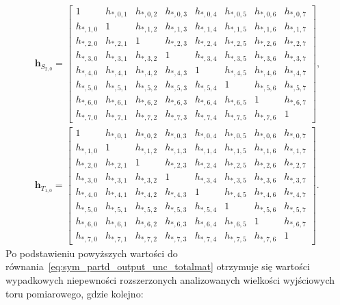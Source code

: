 \begin{gather}
\mathbf{h}_{S_{2,0}} =
\begin{bmatrix}
1 & h_{*,0,1} & h_{*,0,2} & h_{*,0,3} & h_{*,0,4} & h_{*,0,5} & h_{*,0,6} & h_{*,0,7} \\
h_{*,1,0} & 1 & h_{*,1,2} & h_{*,1,3} & h_{*,1,4} & h_{*,1,5} & h_{*,1,6} & h_{*,1,7} \\
h_{*,2,0} & h_{*,2,1} & 1 & h_{*,2,3} & h_{*,2,4} & h_{*,2,5} & h_{*,2,6} & h_{*,2,7} \\
h_{*,3,0} & h_{*,3,1} & h_{*,3,2} & 1 & h_{*,3,4} & h_{*,3,5} & h_{*,3,6} & h_{*,3,7} \\
h_{*,4,0} & h_{*,4,1} & h_{*,4,2} & h_{*,4,3} & 1 & h_{*,4,5} & h_{*,4,6} & h_{*,4,7} \\
h_{*,5,0} & h_{*,5,1} & h_{*,5,2} & h_{*,5,3} & h_{*,5,4} & 1 & h_{*,5,6} & h_{*,5,7} \\
h_{*,6,0} & h_{*,6,1} & h_{*,6,2} & h_{*,6,3} & h_{*,6,4} & h_{*,6,5} & 1 & h_{*,6,7} \\
h_{*,7,0} & h_{*,7,1} & h_{*,7,2} & h_{*,7,3} & h_{*,7,4} & h_{*,7,5} & h_{*,7,6} & 1
\end{bmatrix}
\label{eq:sym_partd_output_unc_cohermat_S_2_0_b}, \\
\mathbf{h}_{T_{1,0}} =
\begin{bmatrix}
1 & h_{*,0,1} & h_{*,0,2} & h_{*,0,3} & h_{*,0,4} & h_{*,0,5} & h_{*,0,6} & h_{*,0,7} \\
h_{*,1,0} & 1 & h_{*,1,2} & h_{*,1,3} & h_{*,1,4} & h_{*,1,5} & h_{*,1,6} & h_{*,1,7} \\
h_{*,2,0} & h_{*,2,1} & 1 & h_{*,2,3} & h_{*,2,4} & h_{*,2,5} & h_{*,2,6} & h_{*,2,7} \\
h_{*,3,0} & h_{*,3,1} & h_{*,3,2} & 1 & h_{*,3,4} & h_{*,3,5} & h_{*,3,6} & h_{*,3,7} \\
h_{*,4,0} & h_{*,4,1} & h_{*,4,2} & h_{*,4,3} & 1 & h_{*,4,5} & h_{*,4,6} & h_{*,4,7} \\
h_{*,5,0} & h_{*,5,1} & h_{*,5,2} & h_{*,5,3} & h_{*,5,4} & 1 & h_{*,5,6} & h_{*,5,7} \\
h_{*,6,0} & h_{*,6,1} & h_{*,6,2} & h_{*,6,3} & h_{*,6,4} & h_{*,6,5} & 1 & h_{*,6,7} \\
h_{*,7,0} & h_{*,7,1} & h_{*,7,2} & h_{*,7,3} & h_{*,7,4} & h_{*,7,5} & h_{*,7,6} & 1
\end{bmatrix}
\label{eq:sym_partd_output_unc_cohermat_T_1_0_b}.
\end{gather}
Po podstawieniu powyższych wartości do równania~\eqref{eq:sym_partd_output_unc_totalmat} otrzymuje się wartości wypadkowych niepewności rozszerzonych analizowanych wielkości wyjściowych toru pomiarowego, gdzie kolejno:
